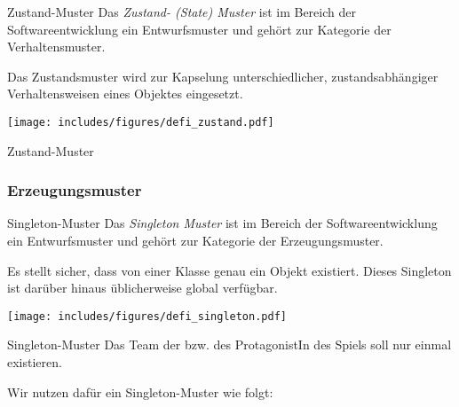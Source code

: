 \begin{defi}{Zustand-Muster}
    Das \emph{Zustand- (State) Muster} ist im Bereich der Softwareentwicklung ein Entwurfsmuster und gehört zur Kategorie der Verhaltensmuster.

    Das Zustandsmuster wird zur Kapselung unterschiedlicher, zustandsabhängiger Verhaltensweisen eines Objektes eingesetzt.

    \begin{center}
        \texttt{[image: includes/figures/defi\_zustand.pdf]}
    \end{center}
\end{defi}

\begin{example}{Zustand-Muster}
    

    

    
\end{example}

\subsubsection{Erzeugungsmuster}

\begin{defi}{Singleton-Muster}
    Das \emph{Singleton Muster} ist im Bereich der Softwareentwicklung ein Entwurfsmuster und gehört zur Kategorie der Erzeugungsmuster.

    Es stellt sicher, dass von einer Klasse genau ein Objekt existiert.
    Dieses Singleton ist darüber hinaus üblicherweise global verfügbar.

    \begin{center}
        \texttt{[image: includes/figures/defi\_singleton.pdf]}
    \end{center}
\end{defi}

\begin{example}{Singleton-Muster}
    Das Team der bzw. des ProtagonistIn des Spiels soll nur einmal existieren.

    Wir nutzen dafür ein Singleton-Muster wie folgt:
    

    
\end{example}

